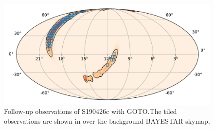 \begin{colsection}
\begin{colsection}
\begin{figure}[p]
    \begin{center}
        \includegraphics[width=0.9\linewidth]{images/190426_goto.pdf}
    \end{center}
    \caption[Follow-up observations of S190426c with GOTO]{
        Follow-up observations of S190426c with GOTO.\@ The tiled observations are shown in  over the background BAYESTAR skymap.
        }\label{fig:190426_goto}
\end{figure}

\clearpage

\end{colsection}


\end{colsection}


\newpage
